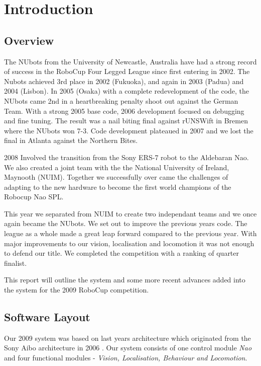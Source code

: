 \section{Introduction}

\subsection{Overview}

The NUbots from the University of Newcastle, Australia have had a strong record of success in the RoboCup Four Legged League since first entering in 2002. The Nubots achieved 3rd place in 2002 (Fukuoka), and again in 2003 (Padua) and 2004 (Lisbon). In 2005 (Osaka) with a complete redevelopment of the code, the NUbots came 2nd in a heartbreaking penalty shoot out against the German Team. With a strong 2005 base code, 2006 development focused on debugging and fine tuning. The result was a nail biting final against rUNSWift in Bremen where the NUbots won 7-3. Code development plateaued in 2007 and we lost the final in Atlanta against the Northern Bites.  

2008 Involved the transition from the Sony ERS-7 robot to the Aldebaran Nao. We also created a joint team with the the National University of Ireland, Maynooth (NUIM). Together we successfully over came the challenges of adapting to the new hardware to become the first world champions of the Robocup Nao SPL.

This year we separated from NUIM to create two independant teams and we once again became the NUbots. We set out to improve the previous years code. The league as a whole made a great leap forward compared to the previous year. With major improvements to our vision, localisation and locomotion it was not enough to defend our title. We completed the competition with a ranking of quarter finalist.

This report will outline the system and some more recent advances added into the system for the 2009 RoboCup competition.

\subsection{Software Layout}

Our 2009 system was based on last years architecture \cite{NUManoids2008}which originated from the Sony Aibo architecture in 2006 \cite{NUBOT2006}. Our system consists of one control module \emph{Nao} and four functional modules -
\emph{Vision, Localisation, Behaviour and Locomotion}. 

